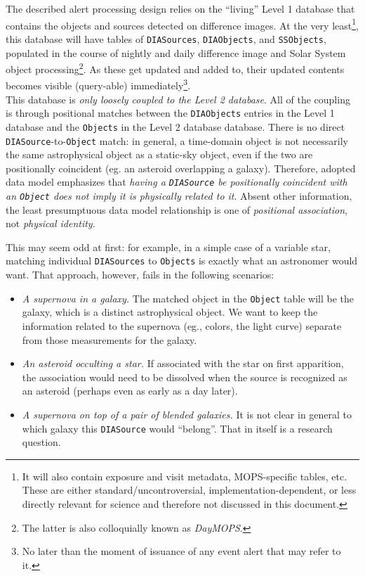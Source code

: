 \documentclass[12pt]{article}
\newcommand{\code}[1]{\texttt{#1}}
\newcommand{\DIASource}{\code{DIASource}\xspace}
\newcommand{\DIASources}{\code{DIASources}\xspace}
\newcommand{\DIAObjects}{\code{DIAObjects}\xspace}
\newcommand{\DB}{{Level 1 database}\xspace}
\newcommand{\DR}{{Level 2 database}\xspace}
\newcommand{\Object}{\code{Object}\xspace}
\newcommand{\Objects}{\code{Objects}\xspace}
\newcommand{\SSObjects}{\code{SSObjects}\xspace}
\newcommand{\req}[1]{\marginpar{\tiny #1}}
\newcommand{\dmreq}[1]{\req{DMS-REQ-#1}}
\begin{document}
The described alert processing design relies on the ``living'' \DB that contains the objects and sources detected on difference images. At the very least\footnote{It will also contain exposure and visit metadata, MOPS-specific tables, etc. These are either standard/uncontroversial, implementation-dependent, or less directly relevant for science and therefore not discussed in this document.}, this database will have tables of \DIASources,\dmreq{0269} \DIAObjects,\dmreq{0271} and \SSObjects,\dmreq{0273} populated in the course of nightly and daily difference image and Solar System object processing\footnote{The latter is also colloquially known as \emph{DayMOPS}.}. As these get updated and added to, their updated contents becomes visible (query-able) immediately\footnote{No later than the moment of issuance of any event alert that may refer to it.}.\dmreq{0312}
\\

This database is \emph{only loosely coupled to the \DR}. All of the coupling is through positional matches between the \DIAObjects entries in the \DB and the \Objects in the \DR database. There is no direct \DIASource-to-\Object match:
in general, a time-domain object is not necessarily the same astrophysical object as a static-sky object, even if the two are
positionally coincident (eg. an asteroid overlapping a galaxy).
Therefore, adopted data model emphasizes that \emph{having a \DIASource be positionally coincident with an \Object does not imply it is physically related to it}. Absent other information, the least presumptuous data model relationship is one of \emph{positional association}, not \emph{physical identity}.

This may seem odd at first: for example, in a simple case of a variable star, matching individual \DIASources to \Objects is exactly what an astronomer would want. That approach, however, fails in the following scenarios:
\begin{itemize}
\item \emph{A supernova in a galaxy.} The matched object in the \Object table will be the galaxy, which is a distinct astrophysical object. We want to keep the information related to the supernova (eg., colors, the light curve) separate from those measurements for the galaxy.
\item \emph{An asteroid occulting a star.} If associated with the star on first apparition, the association would need to be dissolved when the source is recognized as an asteroid (perhaps even as early as a day later).
\item \emph{A supernova on top of a pair of blended galaxies.} It is not clear in general to which galaxy this \DIASource would ``belong''. That in itself is a research question.
\end{itemize}
\end{document}
